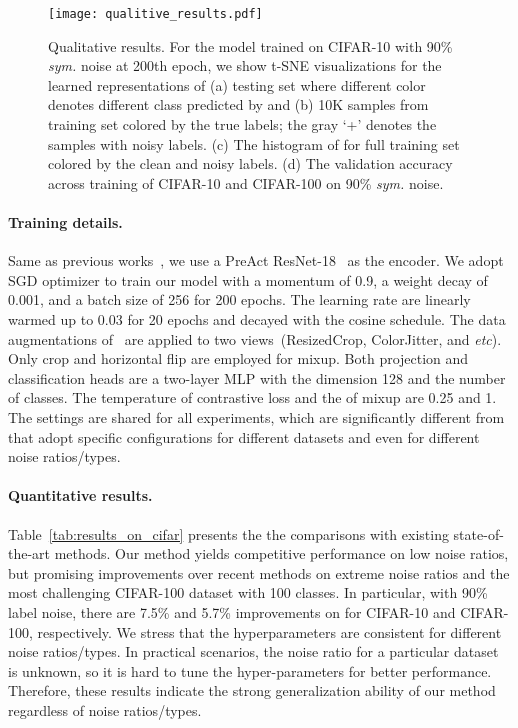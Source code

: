 \begin{figure*}[t]
    \centering
    \texttt{[image: qualitive\_results.pdf]}
    \caption{
        Qualitative results.
        For the model trained on CIFAR-10 with 90\% \textit{sym.} noise at 200th epoch, we show t-SNE visualizations for the learned representations of (a) testing set where different color denotes different class predicted by  and (b) 10K samples from training set colored by the true labels; the gray `+' denotes the samples with noisy labels.  (c) The histogram of  for full training set colored by the clean and noisy labels. (d) The validation accuracy across training of CIFAR-10 and CIFAR-100 on 90\% \textit{sym.} noise.
    }
    \label{fig:qualitive_results}
\end{figure*}

\paragraph{Training details.} 
Same as previous works~\cite{ortego2021multi,li2020dividemix,li2021learning,liu2020early}, we use a PreAct ResNet-18~\cite{he2016identity} as the encoder. We adopt SGD optimizer to train our model with a momentum of 0.9, a weight decay of 0.001, and a batch size of 256 for 200 epochs. The learning rate are linearly warmed up to 0.03 for 20 epochs and decayed with the cosine schedule.
The data augmentations of~\cite{chen2020simple} are applied to two views~(ResizedCrop, ColorJitter, and \textit{etc}). Only crop and horizontal flip are employed for mixup. Both projection and classification heads are a two-layer MLP with the dimension 128 and the number of classes. The temperature  of contrastive loss and the  of mixup are 0.25 and 1. The settings are shared for all experiments, which are significantly different from~\cite{li2020dividemix,li2021learning,liu2020early} that adopt specific configurations for different datasets and even for different noise ratios/types.

\paragraph{Quantitative results.}
Table~\ref{tab:results_on_cifar} presents the the comparisons with existing state-of-the-art methods. Our method yields competitive performance on low noise ratios, but promising improvements over recent methods on extreme noise ratios and the most challenging CIFAR-100 dataset with 100 classes. In particular, with 90\% label noise, there are 7.5\% and 5.7\% improvements on for CIFAR-10 and CIFAR-100, respectively. We stress that the hyperparameters are consistent for different noise ratios/types. In practical scenarios, the noise ratio for a particular dataset is unknown, so it is hard to tune the hyper-parameters for better performance. Therefore, these results indicate the strong generalization ability of our method regardless of noise ratios/types.

